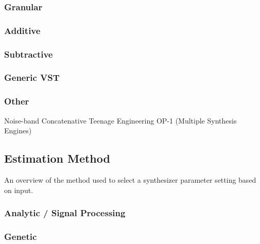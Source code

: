 \subsubsection{Granular}
\cite{fujinaga1994genetic}\cite{johnson1999exploring}

\subsubsection{Additive}
\cite{ethington1994seawave}\cite{horner1995envelope}\cite{horner1996piecewise}\cite{johnson2006timbre}\cite{mintz2007toward}

\subsubsection{Subtractive}
\cite{roth2011comparison}

\subsubsection{Generic VST}
\cite{yee2008synthbot}\cite{heise2009automatic}

\subsubsection{Other}
Noise-band \cite{chinen2007genesynth}
Concatenative \cite{stowell2010making}
Teenage Engineering OP-1 (Multiple Synthesis Engines) \cite{macret2013automatic}

\subsection{Estimation Method}
An overview of the method used to select a synthesizer parameter setting based on input.

\subsubsection{Analytic / Signal Processing}
\cite{justice1979analytic}\cite{beauchamp1982synthesis}\cite{payne1987microcomputer}\cite{ethington1994seawave}

\subsubsection{Genetic}
\cite{horner1993machine}\cite{fujinaga1994genetic}\cite{horner1995envelope}\cite{horner1995wavetable}\cite{riionheimo2003parameter}\cite{mandelis2003musical}\cite{mitchell2005frequency}\cite{mitchell2007evolutionary}
\cite{chinen2007genesynth}\cite{yee2008synthbot}\cite{roth2011comparison}\cite{macret2012automatic}\cite{hamadicharef2012intelligent}\cite{macret2013automatic}

